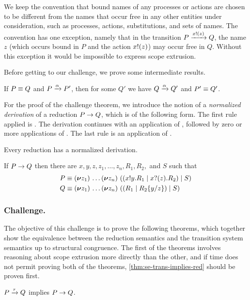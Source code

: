 \documentclass[runningheads]{llncs}
\begin{document}
We keep the convention that bound names of any processes or actions
are chosen to be different from the names that occur free in any other
entities under consideration, such as processes, actions,
substitutions, and sets of names.  The convention has one exception,
namely that in the transition \( P \xrightarrow{x ! (z)} Q \),
the name \( z \) (which occurs bound in \( P \) and the action
\( x ! (z) \)) may occur free in \( Q \).  Without this exception
it would be impossible to express scope extrusion.

Before getting to our challenge, we prove some intermediate results.
\begin{lemma}\label{se-lemma-harmony-fact}
  If \( P \equiv Q \) and \( P \xrightarrow{\alpha} P' \), then for some \( Q' \) we have \( Q \xrightarrow{\alpha} Q' \) and \( P' \equiv Q' \).
\end{lemma}

For the proof of the challenge theorem, we introduce the notion of a \emph{normalized derivation} of a reduction \( P \rightarrow Q \), which is of the following form.
The first rule applied is . The derivation continues with an application of , followed by zero or more applications of .
The last rule is an application of .
\begin{lemma}\label{se-lemma-normalized-derivation}
  Every reduction has a normalized derivation.
\end{lemma}

\begin{lemma}\label{se-lemma-normalized-reduction}
  If \( P \rightarrow Q \) then there are \( x, y, z, z_1, \dots, z_n, R_1, R_2, \) and \( S\) such that
  \begin{align*}
    &P \equiv (\bm{\nu} z_1)~\!\dots (\bm{\nu} z_n)~((x ! y . R_1 \mid x ? (z) . R_2) \mid S) \\
    &Q \equiv (\bm{\nu} z_1)~\!\dots (\bm{\nu} z_n)~((R_1 \mid R_2\{y/z\}) \mid S)
  \end{align*}
\end{lemma}

\subsubsection{Challenge.}
The objective of this challenge is to prove the following theorems, which together show the equivalence between the reduction semantics and the transition system semantics up to structural congruence.
The first of the theorems involves reasoning about scope extrusion more directly than the other, and if time does not permit proving both of the theorems, \cref{thm:se-trans-implies-red} should be proven first.
\begin{theorem}\label{thm:se-trans-implies-red}
  \( P \xrightarrow{\tau} Q \) implies \( P \rightarrow Q \).
\end{theorem}
\end{document}
